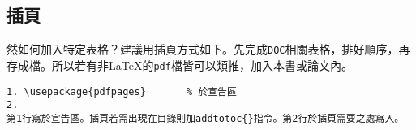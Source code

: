 \subsection{插頁}  
然如何加入特定表格？建議用插頁方式如下。先完成{\tt DOC}相關表格，排好順序，再存成檔。所以若有非\LaTeX{}的{\tt pdf}檔皆可以類推，加入本書或論文內。
\begin{verbatim}
1. \usepackage{pdfpages}       % 於宣告區
2. 
第1行寫於宣告區。插頁若需出現在目錄則加addtotoc{}指令。第2行於插頁需要之處寫入。
\end{verbatim}
